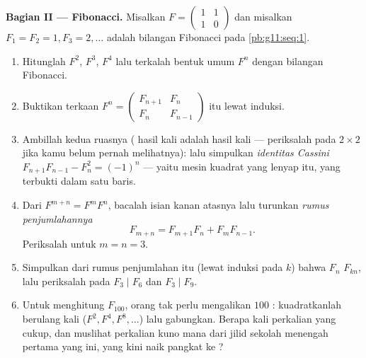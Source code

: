 \begin{problem}
\medskip
\noindent\textbf{Bagian II ---  Fibonacci.}
Misalkan $F = \begin{pmatrix} 1 & 1\\ 1 & 0\end{pmatrix}$ dan misalkan
$F_1 = F_2 = 1, F_3 = 2, \dots$ adalah bilangan Fibonacci pada
\cref{pb:g11:seq:1}.
\begin{enumerate}[resume]
  \item Hitunglah $F^2$, $F^3$, $F^4$ lalu terkalah bentuk umum
        $F^n$ dengan bilangan Fibonacci.
  \item Buktikan terkaan
        $F^n = \begin{pmatrix} F_{n+1} & F_n\\ F_n & F_{n-1}
        \end{pmatrix}$ itu lewat induksi.
  \item Ambillah  kedua ruasnya ( hasil
        kali adalah hasil kali  --- periksalah
        pada  $2 \times 2$ jika kamu belum pernah melihatnya):
        lalu simpulkan \emph{identitas Cassini}
        $F_{n+1}F_{n-1} - F_n^2 = (-1)^n$ --- yaitu mesin
        kuadrat yang lenyap itu, yang terbukti dalam satu baris.
  \item Dari $F^{m+n} = F^m F^n$, bacalah isian
        kanan atasnya lalu turunkan \emph{rumus penjumlahannya}
        \[
        F_{m+n} = F_{m+1} F_n + F_m F_{n-1} .
        \]
        Periksalah untuk $m = n = 3$.
  \item Simpulkan dari rumus penjumlahan itu (lewat induksi pada $k$)
        bahwa $F_n$  $F_{kn}$, lalu periksalah pada
        $F_3 \mid F_6$ dan $F_3 \mid F_9$.
  \item Untuk menghitung $F_{100}$, orang tak perlu mengalikan $100$
        : kuadratkanlah berulang kali ($F^2, F^4, F^8, \dots$)
        lalu gabungkan. Berapa kali perkalian  yang cukup,
        dan muslihat perkalian kuno mana dari jilid sekolah
        menengah pertama yang ini, yang kini naik pangkat ke ?
\end{enumerate}


\end{problem}
